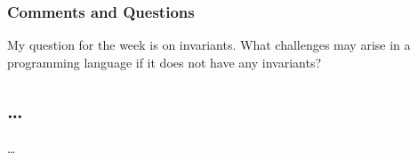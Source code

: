 \documentclass{article}
\theoremstyle{theorem}
\theoremstyle{definition}
\theoremstyle{remark}
\begin{document}
\subsubsection*{Comments and Questions}
My question for the week is on invariants. What challenges may arise in a programming
language if it does not have any invariants?
\subsection{\ldots}
\ldots








\end{document}
